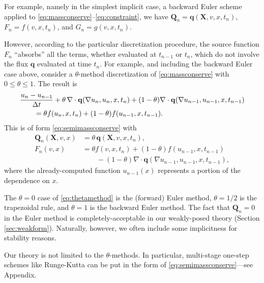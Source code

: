 \documentclass[final,leqno,onefignum,onetabnum]{siamltex1213bueler}
\newcommand\bq{\mathbf{q}}
\newcommand\bQ{\mathbf{Q}}
\newcommand\bX{\mathbf{X}}
\newcommand{\Div}{\nabla\cdot}
\renewcommand{\grad}{\nabla}
\begin{document}
For example, namely in the simplest implicit case, a backward Euler scheme applied to \eqref{eq:massconserve}--\eqref{eq:constraint}, we have $\bQ_n = \bq(\bX,v,x,t_n)$, $F_n = f(v,x,t_n)$, and $G_n = g(v,x,t_n)$.

However, according to the particular discretization procedure, the source function $F_n$ ``absorbs'' all the terms, whether evaluated at $t_{n-1}$ or $t_n$, which do not involve the flux $\bq$ evaluated at time $t_n$.  For example, and including the backward Euler case above, consider a $\theta$-method discretization of \eqref{eq:massconserve} with $0\le \theta \le 1$.  The result is
\begin{align}
  &\frac{u_n - u_{n-1}}{\Delta t} + \theta\, \Div \bq(\grad u_n,u_n,x,t_n) + (1-\theta) \Div \bq(\grad u_{n-1},u_{n-1},x,t_{n-1}) \label{eq:thetamethod} \\
  &\qquad =  \theta f(u_n,x,t_n) + (1-\theta) f(u_{n-1},x,t_{n-1}). \notag
\end{align}
This is of form \eqref{eq:semimassconserve} with
\begin{align*}
\bQ_n(\bX,v,x) &= \theta\, \bq(\bX,v,x,t_n), \\
F_n(v,x)       &= \theta f(v,x,t_n) + (1-\theta) f(u_{n-1},x,t_{n-1}) \\
               &\qquad - (1-\theta) \Div \bq(\grad u_{n-1},u_{n-1},x,t_{n-1}),
\end{align*}
where the already-computed function $u_{n-1}(x)$ represents a portion of the dependence on $x$.

The $\theta=0$ case of \eqref{eq:thetamethod} is the (forward) Euler method, $\theta=1/2$ is the trapezoidal rule, and $\theta=1$ is the backward Euler method.  The fact that $\bQ_n=0$ in the Euler method is completely-acceptable in our weakly-posed theory (Section \ref{sec:weakform}).  Naturally, however, we often include some implicitness for stability reasons.

Our theory is not limited to the $\theta$-methods.  In particular, multi-stage one-step schemes like Runge-Kutta can be put in the form of \eqref{eq:semimassconserve}---see Appendix.
\end{document}
